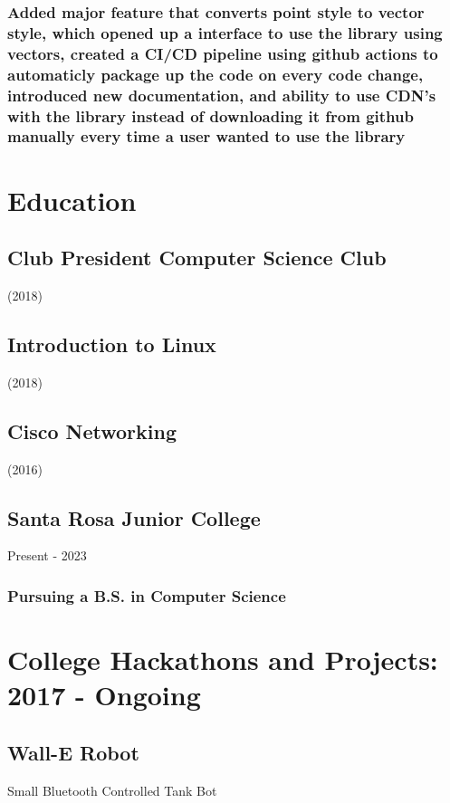 \documentclass{article}
\begin{document}
		\subsubsection{Added major feature that converts point style to vector style, which opened up a interface to use the library using vectors, created a CI/CD pipeline using github actions to automaticly package up the code on every code change, introduced new documentation, and ability to use CDN's with the library instead of downloading it from github manually every time a user wanted to use the library }
		\vspace{-3mm}
			
    		    		
	\section{Education}
        \subsection{Club President  Computer Science Club}  (2018)
        \vspace{-2mm}   
		 
		\subsection{Introduction to Linux}  (2018)
        \vspace{-2mm}   

		\subsection{Cisco Networking}  (2016)
        \vspace{-2mm}   
         
        \subsection{Santa Rosa Junior College} Present - 2023 
        \vspace{-2mm}
            \subsubsection{Pursuing a B.S. in Computer Science}
\section{College Hackathons and Projects: 2017 - Ongoing}

	\subsection{Wall-E Robot}Small Bluetooth Controlled Tank Bot
    	\vspace{-3mm}
\end{document}
